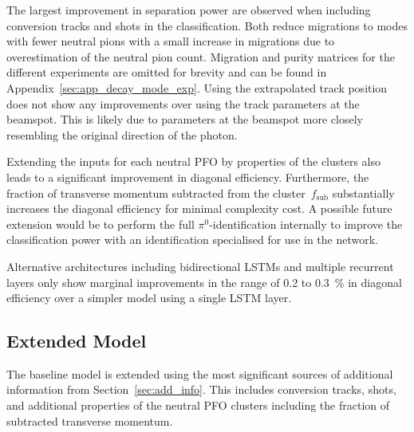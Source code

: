 The largest improvement in separation power are observed when including
conversion tracks and shots in the classification. Both reduce migrations to
modes with fewer neutral pions with a small increase in migrations due to
overestimation of the neutral pion count. Migration and purity matrices for the
different experiments are omitted for brevity and can be found in
Appendix~\ref{sec:app_decay_mode_exp}. Using the extrapolated track position
does not show any improvements over using the track parameters at the beamspot.
This is likely due to parameters at the beamspot more closely resembling the
original direction of the photon. 

Extending the inputs for each neutral PFO by properties of the clusters also
leads to a significant improvement in diagonal efficiency. Furthermore, the
fraction of transverse momentum subtracted from the cluster~$f_\text{sub}$
substantially increases the diagonal efficiency for minimal complexity cost. A
possible future extension would be to perform the full $\pi^0$-identification
internally to improve the classification power with an identification
specialised for use in the network.

Alternative architectures including bidirectional LSTMs and multiple recurrent
layers only show marginal improvements in the range of \num{0.2} to
\SI{0.3}{\percent} in diagonal efficiency over a simpler model using a single
LSTM layer.

\subsection{Extended Model}
\label{sec:extended_model}

The baseline model is extended using the most significant sources of additional
information from Section~\ref{sec:add_info}. This includes conversion tracks,
shots, and additional properties of the neutral PFO clusters including the
fraction of subtracted transverse momentum.


